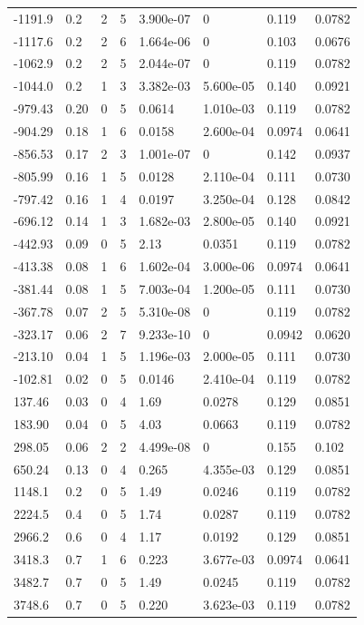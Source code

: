 \documentclass[preview]{standalone}
\begin{document}
{{\begin{tabular}{L{1.2cm}C{1.2cm} C{0.3cm}C{0.5cm} C{1.4cm}C{1.4cm} C{1.4cm}C{1.4cm}}
  -1191.9  &   0.2  & 2     &  5 &  3.900e-07  & 0  & 0.119 &  0.0782   \\ 
  -1117.6  &   0.2  & 2     &  6 &  1.664e-06  & 0  & 0.103 &  0.0676   \\ 
  -1062.9  &   0.2  & 2     &  5 &  2.044e-07  & 0  & 0.119 &  0.0782   \\ 
  -1044.0  &   0.2  & 1     &  3 &  3.382e-03  & 5.600e-05  & 0.140 &  0.0921   \\ 
  -979.43  &  0.20  & 0     &  5 &  0.0614  & 1.010e-03  & 0.119 &  0.0782   \\ 
  -904.29  &  0.18  & 1     &  6 &  0.0158  & 2.600e-04  & 0.0974 &  0.0641   \\ 
  -856.53  &  0.17  & 2     &  3 &  1.001e-07  & 0  & 0.142 &  0.0937   \\ 
  -805.99  &  0.16  & 1     &  5 &  0.0128  & 2.110e-04  & 0.111 &  0.0730   \\ 
  -797.42  &  0.16  & 1     &  4 &  0.0197  & 3.250e-04  & 0.128 &  0.0842   \\ 
  -696.12  &  0.14  & 1     &  3 &  1.682e-03  & 2.800e-05  & 0.140 &  0.0921   \\ 
  -442.93  &  0.09  & 0     &  5 &  2.13  & 0.0351  & 0.119 &  0.0782   \\ 
  -413.38  &  0.08  & 1     &  6 &  1.602e-04  & 3.000e-06  & 0.0974 &  0.0641   \\ 
  -381.44  &  0.08  & 1     &  5 &  7.003e-04  & 1.200e-05  & 0.111 &  0.0730   \\ 
  -367.78  &  0.07  & 2     &  5 &  5.310e-08  & 0  & 0.119 &  0.0782   \\ 
  -323.17  &  0.06  & 2     &  7 &  9.233e-10  & 0  & 0.0942 &  0.0620   \\ 
  -213.10  &  0.04  & 1     &  5 &  1.196e-03  & 2.000e-05  & 0.111 &  0.0730   \\ 
  -102.81  &  0.02  & 0     &  5 &  0.0146  & 2.410e-04  & 0.119 &  0.0782   \\ 
  137.46  &  0.03  & 0     &  4 &  1.69  & 0.0278  & 0.129 &  0.0851   \\ 
  183.90  &  0.04  & 0     &  5 &  4.03  & 0.0663  & 0.119 &  0.0782   \\ 
  298.05  &  0.06  & 2     &  2 &  4.499e-08  & 0  & 0.155 &  0.102   \\ 
  650.24  &  0.13  & 0     &  4 &  0.265  & 4.355e-03  & 0.129 &  0.0851   \\ 
  1148.1  &   0.2  & 0     &  5 &  1.49  & 0.0246  & 0.119 &  0.0782   \\ 
  2224.5  &   0.4  & 0     &  5 &  1.74  & 0.0287  & 0.119 &  0.0782   \\ 
  2966.2  &   0.6  & 0     &  4 &  1.17  & 0.0192  & 0.129 &  0.0851   \\ 
  3418.3  &   0.7  & 1     &  6 &  0.223  & 3.677e-03  & 0.0974 &  0.0641   \\ 
  3482.7  &   0.7  & 0     &  5 &  1.49  & 0.0245  & 0.119 &  0.0782   \\ 
  3748.6  &   0.7  & 0     &  5 &  0.220  & 3.623e-03  & 0.119 &  0.0782   \\ 
\hline 
\end{tabular} 

}}
\end{document}

